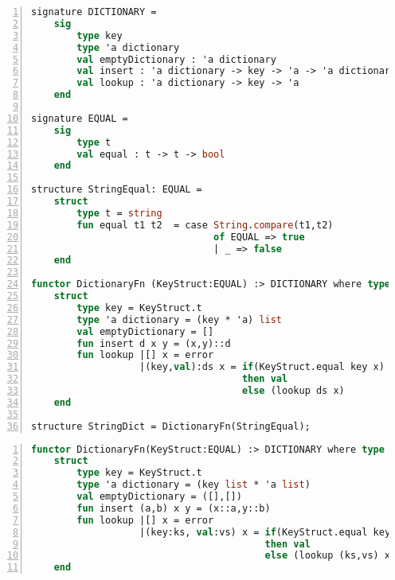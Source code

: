 \documentclass[10pt,a4paper,master=cws, masteroption=ai,english,inputenc=utf8]{kulemt}
\begin{document}
\begin{lstlisting}[frame=single,numbers=left, language=ML, caption=A generic dictionary that can take any type of the EQUAL typeclass as its key.,
label=code:DictionaryFunctor, morekeywords={where}]
signature DICTIONARY =
    sig
        type key
        type 'a dictionary
        val emptyDictionary : 'a dictionary
        val insert : 'a dictionary -> key -> 'a -> 'a dictionary
        val lookup : 'a dictionary -> key -> 'a
    end

signature EQUAL =
    sig
        type t
        val equal : t -> t -> bool
    end

structure StringEqual: EQUAL = 
    struct
        type t = string
        fun equal t1 t2  = case String.compare(t1,t2)
                                of EQUAL => true
                                | _ => false
    end
    
functor DictionaryFn (KeyStruct:EQUAL) :> DICTIONARY where type key = KeyStruct.t =
    struct
        type key = KeyStruct.t
        type 'a dictionary = (key * 'a) list
        val emptyDictionary = []
        fun insert d x y = (x,y)::d
        fun lookup |[] x = error
                   |(key,val):ds x = if(KeyStruct.equal key x)
                                     then val
                                     else (lookup ds x)
    end
    
structure StringDict = DictionaryFn(StringEqual);
\end{lstlisting}

\begin{lstlisting}[frame=single,numbers=left, language=ML, caption=The alternative implementations of the dictionary,
label=code:DictionaryFunctorAlternative, morekeywords={where}, basicstyle=\ttfamily]
functor DictionaryFn(KeyStruct:EQUAL) :> DICTIONARY where type key = KeyStruct.t =
    struct
        type key = KeyStruct.t
        type 'a dictionary = (key list * 'a list)
        val emptyDictionary = ([],[])
        fun insert (a,b) x y = (x::a,y::b)
        fun lookup |[] x = error
                   |(key:ks, val:vs) x = if(KeyStruct.equal key x)
                                         then val
                                         else (lookup (ks,vs) x)
    end
\end{lstlisting}
\end{document}
